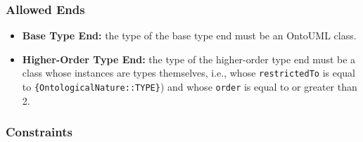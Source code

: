 
\subsubsection{Allowed Ends}

\begin{itemize}
    
    
    \item \textbf{Base Type End:} the type of the base type end must be an OntoUML class.
    
    \item \textbf{Higher-Order Type End:} the type of the higher-order type end must be a class whose instances are types themselves, i.e., whose \texttt{restrictedTo} is equal to \texttt{\{On\-to\-lo\-gi\-cal\-Na\-tu\-re::TYPE\}}) and whose \texttt{order} is equal to or greater than 2.
\end{itemize}



\subsubsection{Constraints}

